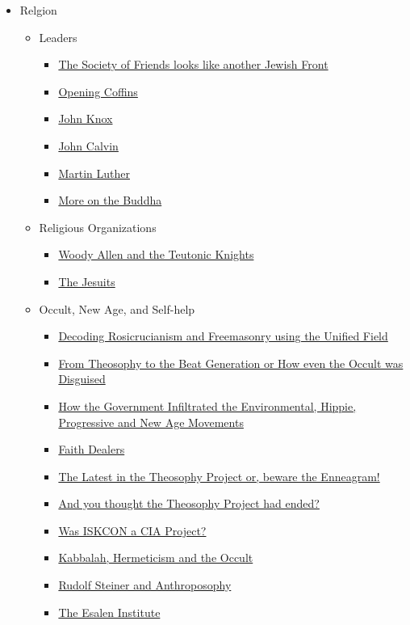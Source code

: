\documentclass{article}
\newcommand{\insertmydocument}[2]{ %
  \item \href{http://www.mileswmathis.com/#2}{#1}
}
\begin{document}
\begin{itemize}
  \item Relgion
  \begin{itemize}

    \item Leaders
    \begin{itemize}

      \insertmydocument{The Society of Friends looks like another Jewish Front}{fox.pdf}
      \insertmydocument{Opening Coffins}{coffin.pdf}
      \insertmydocument{John Knox}{knox.pdf}
      \insertmydocument{John Calvin}{cauvin.pdf}
      \insertmydocument{Martin Luther}{luther.pdf}
      \insertmydocument{More on the Buddha}{budd2.pdf}
    \end{itemize}

    \item Religious Organizations
    \begin{itemize}

      \insertmydocument{Woody Allen and the Teutonic Knights}{allen.pdf}
      \insertmydocument{The Jesuits}{jesuit.pdf}
    \end{itemize}

    \item Occult, New Age, and Self-help
    \begin{itemize}

      \insertmydocument{Decoding Rosicrucianism and Freemasonry using the Unified Field}{rosi.pdf}
      \insertmydocument{From Theosophy to the Beat Generation or How even the Occult was Disguised}{beat.pdf}
      \insertmydocument{How the Government Infiltrated the Environmental, Hippie, Progressive and New Age Movements}{hippie.pdf}
      \insertmydocument{Faith Dealers}{faithdeal.pdf}
      \insertmydocument{The Latest in the Theosophy Project or, beware the Enneagram!}{ennea.pdf}
      \insertmydocument{And you thought the Theosophy Project had ended?}{atheism2.pdf}
      \insertmydocument{Was ISKCON a CIA Project?}{hare.pdf}
      \insertmydocument{Kabbalah, Hermeticism and the Occult}{occult.pdf}
      \insertmydocument{Rudolf Steiner and Anthroposophy}{steiner.pdf}
      \insertmydocument{The Esalen Institute}{esalen.pdf}
    \end{itemize}
  \end{itemize}
\end{itemize}
\end{document}
